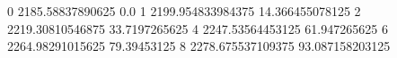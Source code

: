 0 2185.58837890625 0.0
1 2199.954833984375 14.366455078125
2 2219.30810546875 33.7197265625
4 2247.53564453125 61.947265625
6 2264.98291015625 79.39453125
8 2278.675537109375 93.087158203125
